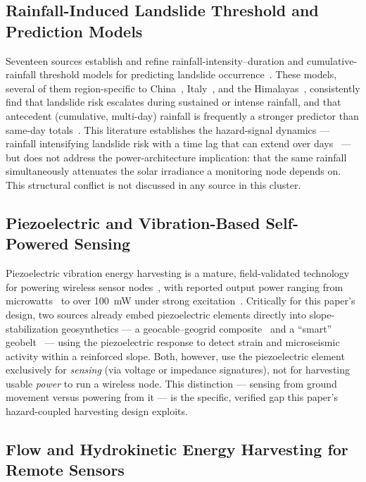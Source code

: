 \documentclass[electronics,article,submit,moreauthors]{Definitions/mdpi}
\begin{document}
\subsection{Rainfall-Induced Landslide Threshold and Prediction Models}

Seventeen sources establish and refine rainfall-intensity--duration and cumulative-rainfall threshold models for predicting landslide occurrence~\cite{ref32,ref33,ref34,ref35,ref36}. These models, several of them region-specific to China~\cite{ref33,ref34,ref37}, Italy~\cite{ref32,ref42,ref43}, and the Himalayas~\cite{ref44,ref46,ref49}, consistently find that landslide risk escalates during sustained or intense rainfall, and that antecedent (cumulative, multi-day) rainfall is frequently a stronger predictor than same-day totals~\cite{ref40,ref45,ref47}. This literature establishes the hazard-signal dynamics --- rainfall intensifying landslide risk with a time lag that can extend over days~\cite{ref48} --- but does not address the power-architecture implication: that the same rainfall simultaneously attenuates the solar irradiance a monitoring node depends on. This structural conflict is not discussed in any source in this cluster.

\subsection{Piezoelectric and Vibration-Based Self-Powered Sensing}

Piezoelectric vibration energy harvesting is a mature, field-validated technology for powering wireless sensor nodes~\cite{ref51,ref55,ref58,ref64}, with reported output power ranging from microwatts~\cite{ref59} to over 100~mW under strong excitation~\cite{ref62}. Critically for this paper's design, two sources already embed piezoelectric elements directly into slope-stabilization geosynthetics --- a geocable--geogrid composite~\cite{ref53} and a ``smart'' geobelt~\cite{ref54} --- using the piezoelectric response to detect strain and microseismic activity within a reinforced slope. Both, however, use the piezoelectric element exclusively for \emph{sensing} (via voltage or impedance signatures), not for harvesting usable \emph{power} to run a wireless node. This distinction --- sensing from ground movement versus powering from it --- is the specific, verified gap this paper's hazard-coupled harvesting design exploits.

\subsection{Flow and Hydrokinetic Energy Harvesting for Remote Sensors}
\end{document}
